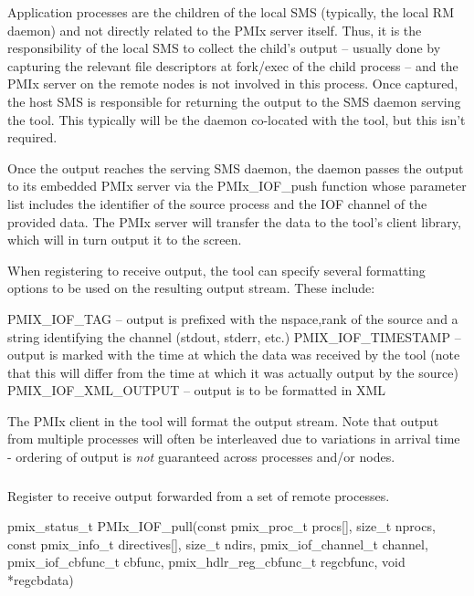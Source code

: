 Application processes are the children of the local SMS (typically, the local RM daemon) and not directly related to the PMIx server itself. Thus, it is the responsibility of the local SMS to collect the child’s output – usually done by capturing the relevant file descriptors at fork/exec of the child process – and the PMIx server on the remote nodes is not involved in this process. Once captured, the host SMS is responsible for returning the output to the SMS daemon serving the tool. This typically will be the daemon co-located with the tool, but this isn’t required.

Once the output reaches the serving SMS daemon, the daemon passes the output to its embedded PMIx server via the PMIx_IOF_push function whose parameter list includes the identifier of the source process and the IOF channel of the provided data. The PMIx server will transfer the data to the tool’s client library, which will in turn output it to the screen.

When registering to receive output, the tool can specify several formatting options to be used on the resulting output stream. These include:

    PMIX_IOF_TAG – output is prefixed with the nspace,rank of the source and a string identifying the channel (stdout, stderr, etc.)
    PMIX_IOF_TIMESTAMP – output is marked with the time at which the data was received by the tool (note that this will differ from the time at which it was actually output by the source)
    PMIX_IOF_XML_OUTPUT – output is to be formatted in XML

The PMIx client in the tool will format the output stream. Note that output from multiple processes will often be interleaved due to variations in arrival time - ordering of output is \emph{not} guaranteed across processes and/or nodes.

\subsubsection{}

\summary

Register to receive output forwarded from a set of remote processes.

\format

\cspecificstart
\begin{codepar}
pmix_status_t
PMIx_IOF_pull(const pmix_proc_t procs[], size_t nprocs,
              const pmix_info_t directives[], size_t ndirs,
              pmix_iof_channel_t channel, pmix_iof_cbfunc_t cbfunc,
              pmix_hdlr_reg_cbfunc_t regcbfunc, void *regcbdata)
\end{codepar}
\cspecificend

